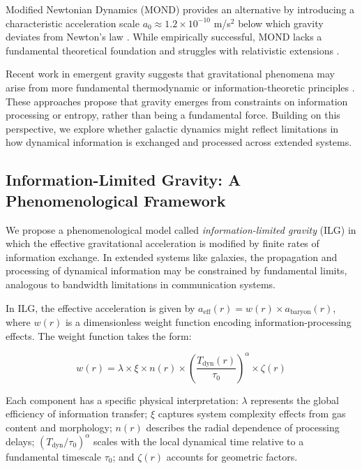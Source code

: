 \documentclass[12pt,a4paper]{article}
\begin{document}
Modified Newtonian Dynamics (MOND) provides an alternative by introducing a characteristic acceleration scale $a_0 \approx 1.2 \times 10^{-10}$ m/s$^2$ below which gravity deviates from Newton's law \citep{milgrom1983}. While empirically successful, MOND lacks a fundamental theoretical foundation and struggles with relativistic extensions \citep{famaey2012}.

Recent work in emergent gravity suggests that gravitational phenomena may arise from more fundamental thermodynamic or information-theoretic principles \citep{verlinde2011, verlinde2017}. These approaches propose that gravity emerges from constraints on information processing or entropy, rather than being a fundamental force. Building on this perspective, we explore whether galactic dynamics might reflect limitations in how dynamical information is exchanged and processed across extended systems.

\subsection{Information-Limited Gravity: A Phenomenological Framework}

We propose a phenomenological model called \emph{information-limited gravity} (ILG) in which the effective gravitational acceleration is modified by finite rates of information exchange. In extended systems like galaxies, the propagation and processing of dynamical information may be constrained by fundamental limits, analogous to bandwidth limitations in communication systems.

In ILG, the effective acceleration is given by $a_\mathrm{eff}(r) = w(r) \times a_\mathrm{baryon}(r)$, where $w(r)$ is a dimensionless weight function encoding information-processing effects. The weight function takes the form:

\begin{equation}
w(r) = \lambda \times \xi \times n(r) \times \left(\frac{T_\mathrm{dyn}(r)}{\tau_0}\right)^\alpha \times \zeta(r)
\end{equation}

Each component has a specific physical interpretation: $\lambda$ represents the global efficiency of information transfer; $\xi$ captures system complexity effects from gas content and morphology; $n(r)$ describes the radial dependence of processing delays; $(T_\mathrm{dyn}/\tau_0)^\alpha$ scales with the local dynamical time relative to a fundamental timescale $\tau_0$; and $\zeta(r)$ accounts for geometric factors.
\end{document}

